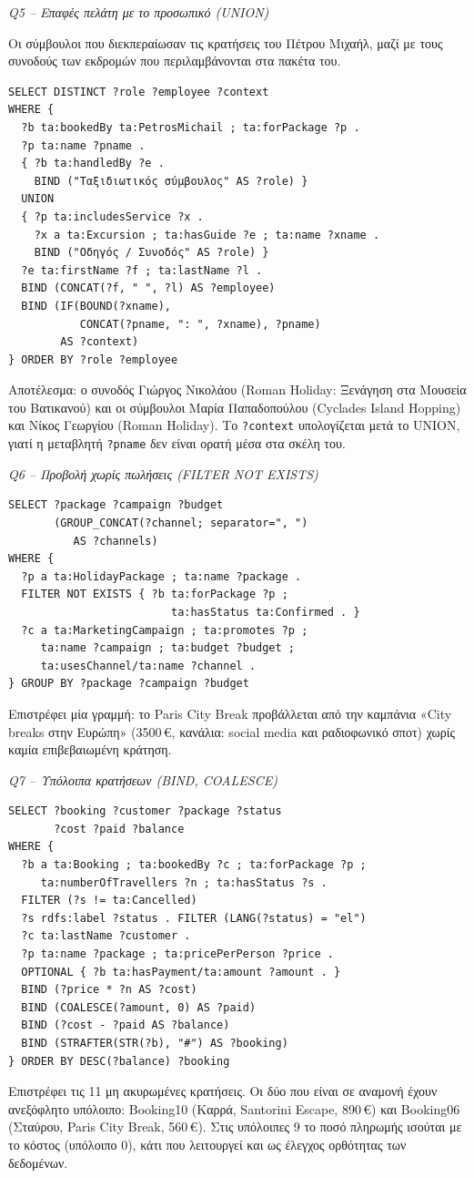 \documentclass[conference]{IEEEtran}
\newcommand{\query}[1]{\par\medskip\noindent\textit{#1}\par\nobreak\smallskip}
\begin{document}
\query{Q5 -- Επαφές πελάτη με το προσωπικό (UNION)}
Οι σύμβουλοι που διεκπεραίωσαν τις κρατήσεις του Πέτρου Μιχαήλ, μαζί με τους
συνοδούς των εκδρομών που περιλαμβάνονται στα πακέτα του.
\begin{lstlisting}
SELECT DISTINCT ?role ?employee ?context
WHERE {
  ?b ta:bookedBy ta:PetrosMichail ; ta:forPackage ?p .
  ?p ta:name ?pname .
  { ?b ta:handledBy ?e .
    BIND ("Ταξιδιωτικός σύμβουλος" AS ?role) }
  UNION
  { ?p ta:includesService ?x .
    ?x a ta:Excursion ; ta:hasGuide ?e ; ta:name ?xname .
    BIND ("Οδηγός / Συνοδός" AS ?role) }
  ?e ta:firstName ?f ; ta:lastName ?l .
  BIND (CONCAT(?f, " ", ?l) AS ?employee)
  BIND (IF(BOUND(?xname),
           CONCAT(?pname, ": ", ?xname), ?pname)
        AS ?context)
} ORDER BY ?role ?employee
\end{lstlisting}
Αποτέλεσμα: ο συνοδός Γιώργος Νικολάου (Roman Holiday: Ξενάγηση στα Μουσεία του
Βατικανού) και οι σύμβουλοι Μαρία Παπαδοπούλου (Cyclades Island Hopping) και Νίκος
Γεωργίου (Roman Holiday). Το \texttt{?context} υπολογίζεται μετά το UNION, γιατί
η μεταβλητή \texttt{?pname} δεν είναι ορατή μέσα στα σκέλη του.

\query{Q6 -- Προβολή χωρίς πωλήσεις (FILTER NOT EXISTS)}
\begin{lstlisting}
SELECT ?package ?campaign ?budget
       (GROUP_CONCAT(?channel; separator=", ")
          AS ?channels)
WHERE {
  ?p a ta:HolidayPackage ; ta:name ?package .
  FILTER NOT EXISTS { ?b ta:forPackage ?p ;
                         ta:hasStatus ta:Confirmed . }
  ?c a ta:MarketingCampaign ; ta:promotes ?p ;
     ta:name ?campaign ; ta:budget ?budget ;
     ta:usesChannel/ta:name ?channel .
} GROUP BY ?package ?campaign ?budget
\end{lstlisting}
Επιστρέφει μία γραμμή: το Paris City Break προβάλλεται από την καμπάνια «City
breaks στην Ευρώπη» (3500\,€, κανάλια: social media και ραδιοφωνικό σποτ) χωρίς
καμία επιβεβαιωμένη κράτηση.

\query{Q7 -- Υπόλοιπα κρατήσεων (BIND, COALESCE)}
\begin{lstlisting}
SELECT ?booking ?customer ?package ?status
       ?cost ?paid ?balance
WHERE {
  ?b a ta:Booking ; ta:bookedBy ?c ; ta:forPackage ?p ;
     ta:numberOfTravellers ?n ; ta:hasStatus ?s .
  FILTER (?s != ta:Cancelled)
  ?s rdfs:label ?status . FILTER (LANG(?status) = "el")
  ?c ta:lastName ?customer .
  ?p ta:name ?package ; ta:pricePerPerson ?price .
  OPTIONAL { ?b ta:hasPayment/ta:amount ?amount . }
  BIND (?price * ?n AS ?cost)
  BIND (COALESCE(?amount, 0) AS ?paid)
  BIND (?cost - ?paid AS ?balance)
  BIND (STRAFTER(STR(?b), "#") AS ?booking)
} ORDER BY DESC(?balance) ?booking
\end{lstlisting}
Επιστρέφει τις 11 μη ακυρωμένες κρατήσεις. Οι δύο που είναι σε αναμονή έχουν
ανεξόφλητο υπόλοιπο: Booking10 (Καρρά, Santorini Escape, 890\,€) και Booking06
(Σταύρου, Paris City Break, 560\,€). Στις υπόλοιπες 9 το ποσό πληρωμής ισούται με
το κόστος (υπόλοιπο 0), κάτι που λειτουργεί και ως έλεγχος ορθότητας των δεδομένων.
\end{document}
